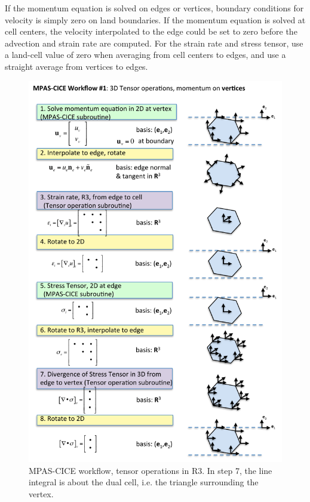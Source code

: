 \documentclass[11pt]{report}
\begin{document}
If the momentum equation is solved on edges or vertices, boundary conditions for velocity is simply zero on land boundaries.  If the momentum equation is solved at cell centers, the velocity interpolated to the edge could be set to zero before the advection and strain rate are computed.  For the strain rate and stress tensor, use a land-cell value of zero when averaging from cell centers to edges, and use a straight average from vertices to edges.

\begin{figure}[htbp]
 \center
 \includegraphics[scale=0.9]{f/mpasCICE_tensor_workflow1.pdf}
 \caption{MPAS-CICE workflow, tensor operations in R3.  In step 7, the line integral is about the dual cell, i.e. the triangle surrounding the vertex.}
 \label{fig:mpasCICE_tensor_workflow1}
\end{figure}
\end{document}
